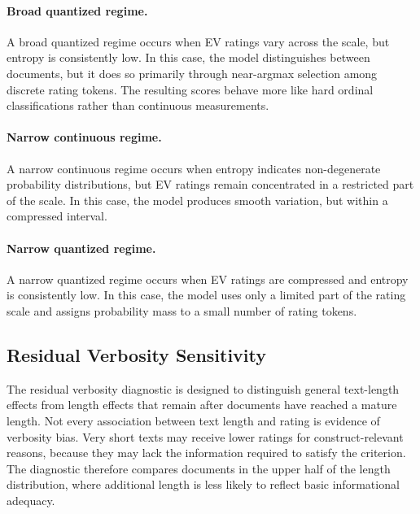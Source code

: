 \paragraph{Broad quantized regime.}
A broad quantized regime occurs when EV ratings vary across the scale, but entropy is consistently low. In this case, the model distinguishes between documents, but it does so primarily through near-argmax selection among discrete rating tokens. The resulting scores behave more like hard ordinal classifications rather than continuous measurements.

\paragraph{Narrow continuous regime.}
A narrow continuous regime occurs when entropy indicates non-degenerate probability distributions, but EV ratings remain concentrated in a restricted part of the scale. In this case, the model produces smooth variation, but within a compressed interval. 


\paragraph{Narrow quantized regime.}
A narrow quantized regime occurs when EV ratings are compressed and entropy is consistently low. In this case, the model uses only a limited part of the rating scale and assigns probability mass to a small number of rating tokens. 


\subsection{Residual Verbosity Sensitivity}
\label{app:residual_verbosity_sensitivity}

The residual verbosity diagnostic is designed to distinguish general text-length effects from length effects that remain after documents have reached a mature length. Not every association between text length and rating is evidence of verbosity bias. Very short texts may receive lower ratings for construct-relevant reasons, because they may lack the information required to satisfy the criterion. The diagnostic therefore compares documents in the upper half of the length distribution, where additional length is less likely to reflect basic informational adequacy.

